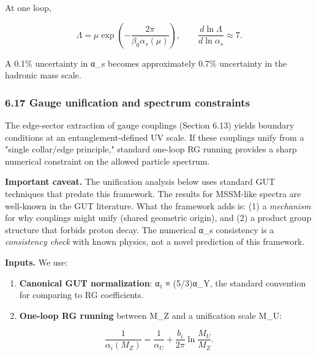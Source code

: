 At one loop,

\[
\Lambda = \mu \exp\left(-\frac{2\pi}{\beta_0 \alpha_s(\mu)}\right),
\qquad
\frac{d \ln \Lambda}{d \ln \alpha_s} \approx 7.
\]

A 0.1\% uncertainty in α\_s becomes approximately 0.7\% uncertainty in the hadronic mass scale.

\subsubsection{6.17 Gauge unification and spectrum constraints}\label{617-gauge-unification-and-spectrum-constraints}

The edge-sector extraction of gauge couplings (Section 6.13) yields boundary conditions at an entanglement-defined UV scale. If these couplings unify from a "single collar/edge principle," standard one-loop RG running provides a sharp numerical constraint on the allowed particle spectrum.

\textbf{Important caveat.} The unification analysis below uses standard GUT techniques that predate this framework. The results for MSSM-like spectra are well-known in the GUT literature. What the framework adds is: (1) a \emph{mechanism} for why couplings might unify (shared geometric origin), and (2) a product group structure that forbids proton decay. The numerical α\_s consistency is a \emph{consistency check} with known physics, not a novel prediction of this framework.

\textbf{Inputs.} We use:

\begin{enumerate}
\def\labelenumi{\arabic{enumi}.}
\item
  \textbf{Canonical GUT normalization}: α₁ ≡ (5/3)α\_Y, the standard convention for comparing to RG coefficients.
\item
  \textbf{One-loop RG running} between M\_Z and a unification scale M\_U:
\end{enumerate}

\[
\frac{1}{\alpha_i(M_Z)} = \frac{1}{\alpha_U} + \frac{b_i}{2\pi}
\ln\frac{M_U}{M_Z}.
\]

